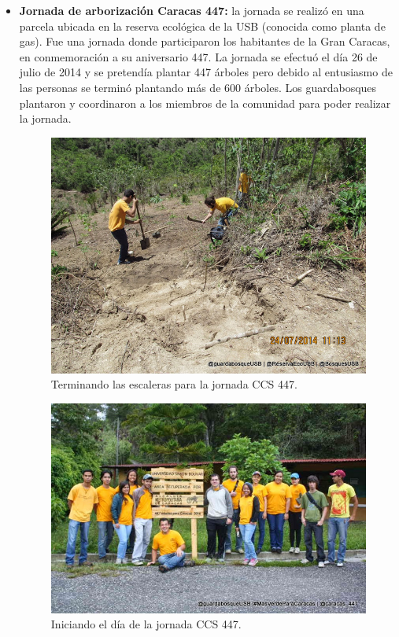 \begin{itemize}
\item \textbf{Jornada de arborización Caracas 447:} la jornada se realizó en una parcela ubicada en la reserva ecológica de la USB (conocida como planta de gas). Fue una jornada donde participaron los habitantes de la Gran Caracas, en conmemoración a su aniversario 447. La jornada se efectuó el día 26 de julio de 2014 y se pretendía plantar 447 árboles pero debido al entusiasmo de las personas se terminó plantando más de 600 árboles. Los guardabosques plantaron y coordinaron a los miembros de la comunidad para poder realizar la jornada.

\begin{figure}[h]
    \centering
    \includegraphics[scale=0.5]{imagenes/foto8}
    \caption{Terminando las escaleras para la jornada CCS 447.}
    \label{foto8}
\end{figure}

\begin{figure}[H]
    \centering
    \includegraphics[scale=0.5]{imagenes/foto9}
    \caption{Iniciando el día de la jornada CCS 447.}
    \label{foto9}
\end{figure}


\end{itemize}
